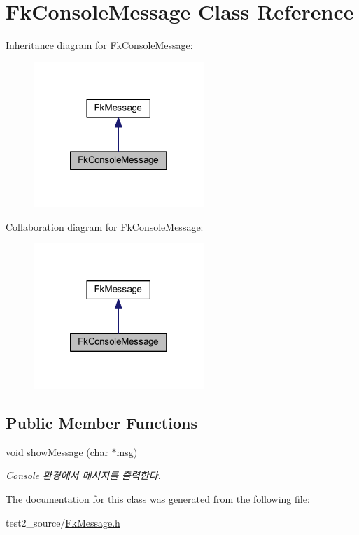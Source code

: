 \hypertarget{class_fk_console_message}{}\section{Fk\+Console\+Message Class Reference}
\label{class_fk_console_message}


Inheritance diagram for Fk\+Console\+Message\+:\nopagebreak
\begin{figure}[H]
\begin{center}
\leavevmode
\includegraphics[width=182pt]{class_fk_console_message__inherit__graph}
\end{center}
\end{figure}


Collaboration diagram for Fk\+Console\+Message\+:\nopagebreak
\begin{figure}[H]
\begin{center}
\leavevmode
\includegraphics[width=182pt]{class_fk_console_message__coll__graph}
\end{center}
\end{figure}
\subsection*{Public Member Functions}
\begin{DoxyCompactItemize}
\item 
\hypertarget{class_fk_console_message_acf960136bbb9ee825a75cdea8d3225bc}{}void \hyperlink{class_fk_console_message_acf960136bbb9ee825a75cdea8d3225bc}{show\+Message} (char $\ast$msg)\label{class_fk_console_message_acf960136bbb9ee825a75cdea8d3225bc}

\begin{DoxyCompactList}\small\item\em Console 환경에서 메시지를 출력한다. \end{DoxyCompactList}\end{DoxyCompactItemize}


The documentation for this class was generated from the following file\+:\begin{DoxyCompactItemize}
\item 
test2\+\_\+source/\hyperlink{_fk_message_8h}{Fk\+Message.\+h}\end{DoxyCompactItemize}
